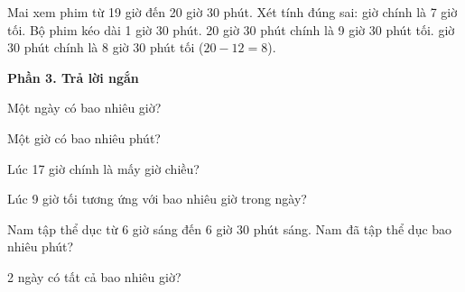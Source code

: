 \begin{ex} %
Mai xem phim từ 19 giờ đến 20 giờ 30 phút. Xét tính đúng sai:
\choiceTF
{ giờ chính là 7 giờ tối.}
{\True Bộ phim kéo dài 1 giờ 30 phút.}
{20 giờ 30 phút chính là 9 giờ 30 phút tối.}
{ giờ 30 phút chính là 8 giờ 30 phút tối ($20 - 12 = 8$).}
\end{ex}

\textbf{Phần 3. Trả lời ngắn}

\begin{ex} %
Một ngày có bao nhiêu giờ?
\end{ex}

\begin{ex} %
Một giờ có bao nhiêu phút?
\end{ex}

\begin{ex} %
Lúc 17 giờ chính là mấy giờ chiều?
\end{ex}

\begin{ex} %
Lúc 9 giờ tối tương ứng với bao nhiêu giờ trong ngày?
\end{ex}

\begin{ex} %
Nam tập thể dục từ 6 giờ sáng đến 6 giờ 30 phút sáng. Nam đã tập thể dục bao nhiêu phút?
\end{ex}

\begin{ex} %
2 ngày có tất cả bao nhiêu giờ?
\end{ex}
